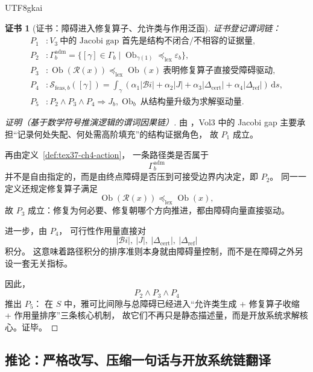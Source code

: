 \documentclass[12pt]{article}
\newtheorem{Certificate}{证书}[section]
\begin{document}
\begin{CJK*}{UTF8}{gkai}
\begin{Certificate}[证书：障碍进入修复算子、允许类与作用泛函]
\label{cert:tex37-ch19-jacobi-driver}
证书登记谓词链：
\[
\begin{aligned}
  P_1 &: V_3\ \text{中的 Jacobi gap 首先是结构不闭合/不相容的证据量},\\
  P_2 &: \Gamma_b^{\mathrm{adm}}
  =
  \{[\gamma]\in\Gamma_b\mid \operatorname{Ob}_{\gamma(1)}\preceq_{\mathrm{lex}}\varepsilon_b\},\\
  P_3 &: \operatorname{Ob}(\mathcal R(x))\preceq_{\mathrm{lex}}\operatorname{Ob}(x)\ \text{表明修复算子直接受障碍驱动},\\
  P_4 &: \mathcal{S}_{\mathrm{feas},b}([\gamma])=\int_\gamma(\alpha_1|\mathcal{B}
    \!i|+\alpha_2|J|+\alpha_3|\Delta_{\mathrm{cert}}|+\alpha_4|\Delta_{\mathrm{ref}}|)\,\mathrm{d}s,\\
  P_5 &: P_2\wedge P_3\wedge P_4\Rightarrow J_b,\operatorname{Ob}_b\ \text{从结构量升级为求解驱动量}.
\end{aligned}
\]
\end{Certificate}

\begin{proof}[证明（基于数学符号推演逻辑的谓词因果链）]
由 \cite{GaoZhengAppVol3}，Vol3 中的 Jacobi gap 主要承担“记录何处失配、何处需高阶填充”的结构证据角色，
故 $P_1$ 成立。

再由定义~\ref{def:tex37-ch4-action}，
一条路径类是否属于
\[
  \Gamma_b^{\mathrm{adm}}
\]
并不是自由指定的，而是由终点障碍是否压到可接受边界内决定，即 $P_2$。
同一一定义还规定修复算子满足
\[
  \operatorname{Ob}(\mathcal R(x))
  \preceq_{\mathrm{lex}}
  \operatorname{Ob}(x),
\]
故 $P_3$ 成立：修复为何必要、修复朝哪个方向推进，都由障碍向量直接驱动。

进一步，由 $P_4$，
可行性作用量直接对
\[
  |\mathcal{B}\!i|,
  \ |J|,
  \ |\Delta_{\mathrm{cert}}|,
  \ |\Delta_{\mathrm{ref}}|
\]
积分。
这意味着路径积分的排序准则本身就由障碍量控制，而不是在障碍之外另设一套无关指标。

因此，
\[
  P_2\wedge P_3\wedge P_4
\]
推出 $P_5$：
在 $S$ 中，雅可比间隙与总障碍已经进入“允许类生成 + 修复算子收缩 + 作用量排序”三条核心机制，
故它们不再只是静态描述量，而是开放系统求解核心。证毕。
\end{proof}

\subsection{推论：严格改写、压缩一句话与开放系统链翻译}
\label{subsec:tex37-ch19-corollaries}


\end{CJK*}
\end{document}
